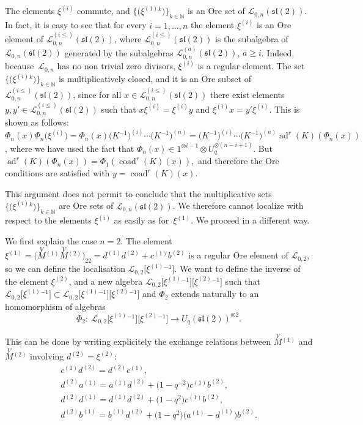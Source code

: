 \documentclass[pdftex]{sigma}%
\numberwithin{equation}{section}
\numberwithin{figure}{section}
\newcommand{\Ll}{{\mathcal L}}
\begin{document}
The elements $\xi^{(i)}$ commute, and $\big\{\big(\xi^{(1)}{}^k\big)\big\}_{k\in {\mathbb N}}$ is an Ore set of $\Ll_{0,n}({\mathfrak{sl}}(2))$. In fact, it is easy to see that for every $i=1,\dots, n$ the element $\xi^{(i)}$ is an Ore element of $\Ll_{0,n}^{(i\leq)}({\mathfrak{sl}}(2))$, where $\Ll_{0,n}^{(i\leq)}({\mathfrak{sl}}(2))$ is the subalgebra of $\Ll_{0,n}({\mathfrak{sl}}(2))$ generated by the subalgebras $\Ll_{0,n}^{(a)}({\mathfrak{sl}}(2))$, $a\geq i$. Indeed, because~$\Ll_{0,n}$ has no non trivial zero divisors, $\xi^{(i)}$ is a regular element. The set $\big\{\big(\xi^{(i)}{}^k\big)\big\}_{k\in {\mathbb N}}$ is multiplicatively closed, and it is an Ore subset of $\Ll_{0,n}^{(i\leq)}({\mathfrak{sl}}(2))$, since for all $x\in \Ll_{0,n}^{(i\leq)}({\mathfrak{sl}}(2))$ there exist elements $y,y'\in \Ll_{0,n}^{(i\leq)}({\mathfrak{sl}}(2))$ such that
$x\xi^{(i)}=\xi^{(i)}y$ and $\xi^{(i)}x=y'\xi^{(i)}$. This is shown as follows: $\Phi_n(x)\Phi_n\big(\xi^{(i)}\big)=
\Phi_n(x)\big(K^{-1}\big)^{(i)}\cdots \big(K^{-1}\big)^{(n)} =\big(K^{-1}\big)^{(i)}\cdots \big(K^{-1}\big)^{(n)}\operatorname{ad}^r(K)(\Phi_n(x))$, where we have used the fact that $\Phi_n(x)\in 1^{\otimes i-1}\otimes U_q^{\otimes (n-i+1)}$. But $\operatorname{ad}^r(K)(\Phi_n(x))=\Phi_1(\operatorname{coad}^r(K)(x)),$ and therefore the Ore conditions are satisfied with $y=\operatorname{coad}^r(K)(x)$.

This argument does not permit to conclude that the multiplicative sets $\big\{\big(\xi^{(i)}{}^k\big)\big\}_{k\in {\mathbb N}}$ are Ore sets of $\Ll_{0,n}({\mathfrak{sl}}(2))$. We therefore cannot localize with respect to the elements $\xi^{(i)}$ as easily as for~$\xi^{(1)}$. We proceed in a different way.

We first explain the case $n=2$. The element $\xi^{(1)}=\big(\!\stackrel{V}{M}{}^{\!\! (1)}\stackrel{V}{M}{}^{\!\! (2)}\big)_{22}=d^{(1)}d^{(2)}+c^{(1)}b^{(2)}$ is a regular Ore element of $\Ll_{0,2}$, so we can define the localisation
$\Ll_{0,2}\big[\xi^{(1)}{}^{-1}\big].$ We want to define the inverse of the element $\xi^{(2)}$, and a new algebra $\Ll_{0,2}\big[\xi^{(1)}{}^{-1}\big]\big[\xi^{(2)}{}^{-1}\big]$ such that $\Ll_{0,2}\big[\xi^{(1)}{}^{-1}\big]\subset \Ll_{0,2}\big[\xi^{(1)}{}^{-1}\big]\big[\xi^{(2)}{}^{-1}\big]$ and $\Phi_2$ extends naturally to an homomorphism of algebras
\[
\Phi_2\colon\ \Ll_{0,2}\big[\xi^{(1)}{}^{-1}\big]\big[\xi^{(2)}{}^{-1}\big]\rightarrow U_q({\mathfrak{sl}}(2))^{\otimes 2}.
\]

This can be done by writing explicitely the exchange relations between $\stackrel{V}{M}{}^{\!\! (1)}$ and $\stackrel{V}{M}{}^{\!\! (2)}$ involving $d^{(2)}=\xi^{(2)}$:
\begin{gather*}
c^{(1)}d^{(2)}=d^{(2)}c^{(1)},\\
d^{(2)}a^{(1)}=a^{(1)}d^{(2)}+\big(1-q^{-2}\big) c^{(1)}b^{(2)},\\
d^{(2)}d^{(1)}=d^{(1)}d^{(2)}+\big(1-q^{2}\big)c^{(1)}b^{(2)},\\
d^{(2)}b^{(1)}=b^{(1)}d^{(2)}+\big(1-q^2\big)\big(a^{(1)}-d^{(1)}\big)b^{(2)}.
\end{gather*}
\end{document}
